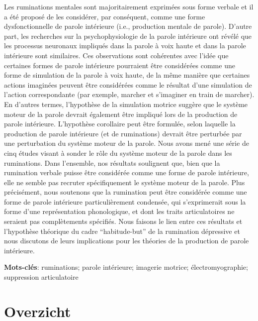 \documentclass[a4paper,12pt,twoside,onecolumn,openright,final,oldfontcommands]{memoir}
\newcommand{\initial}[1]{
	\lettrine[lines=3,lhang=0.33,nindent=0em]{
		\color{gray}
     		{\textsc{#1}}}{}}
\newcommand\blankpage{%
    \null
    \thispagestyle{empty}%
    \newpage
    }
\begin{document}
\initial{L}es ruminations mentales sont majoritairement exprimées sous forme verbale et il a été proposé de les considérer, par conséquent, comme une forme dysfonctionnelle de parole intérieure (i.e., production mentale de parole). D'autre part, les recherches sur la psychophysiologie de la parole intérieure ont révélé que les processus neuronaux impliqués dans la parole à voix haute et dans la parole intérieure sont similaires. Ces observations sont cohérentes avec l'idée que certaines formes de parole intérieure pourraient être considérées comme une forme de simulation de la parole à voix haute, de la même manière que certaines actions imaginées peuvent être considérées comme le résultat d'une simulation de l'action correspondante (par exemple, marcher et s'imaginer en train de marcher). En d'autres termes, l'hypothèse de la simulation motrice suggère que le système moteur de la parole devrait également être impliqué lors de la production de parole intérieure. L'hypothèse corollaire peut être formulée, selon laquelle la production de parole intérieure (et de ruminations) devrait être perturbée par une perturbation du système moteur de la parole. Nous avons mené une série de cinq études visant à sonder le rôle du système moteur de la parole dans les ruminations. Dans l'ensemble, nos résultats soulignent que, bien que la rumination verbale puisse être considérée comme une forme de parole intérieure, elle ne semble pas recruter spécifiquement le système moteur de la parole. Plus précisément, nous soutenons que la rumination peut être considérée comme une forme de parole intérieure particulièrement condensée, qui s'exprimerait sous la forme d'une représentation phonologique, et dont les traits articulatoires ne seraient pas complètements spécifiés. Nous faisons le lien entre ces résultats et l'hypothèse théorique du cadre \enquote{habitude-but} de la rumination dépressive et nous discutons de leurs implications pour les théories de la production de parole intérieure.

\vspace{\baselineskip}

\textbf{Mots-clés}: ruminations; parole intérieure; imagerie motrice; électromyographie; suppression articulatoire

\afterpage{\blankpage}

\chapter*{Overzicht}
\end{document}
